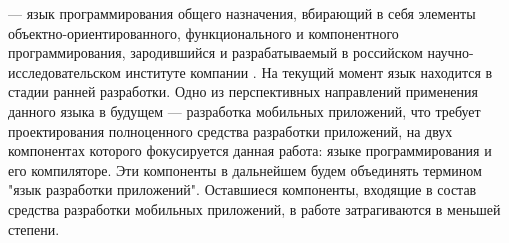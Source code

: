 

 --- язык программирования общего назначения, вбирающий в себя
элементы объектно-ориентированного, функционального и компонентного
программирования, зародившийся и разрабатываемый в российском
научно-исследовательском институте компании . На текущий момент
язык находится в стадии ранней разработки. Одно из перспективных
направлений применения данного языка в будущем --- разработка мобильных приложений, что требует проектирования полноценного средства разработки
приложений, на двух компонентах которого фокусируется данная работа: языке
программирования  и его компиляторе. Эти компоненты в
дальнейшем будем объединять термином "язык разработки приложений".
Оставшиеся компоненты, входящие в состав средства разработки мобильных приложений, в работе затрагиваются в меньшей степени.